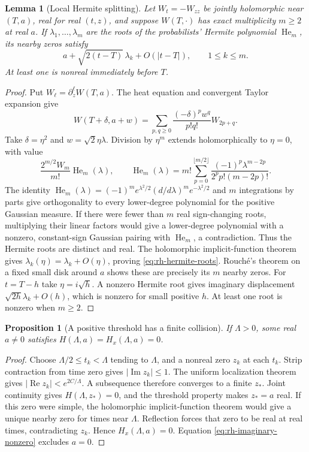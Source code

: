 \documentclass[11pt]{article}
\numberwithin{equation}{section}
\newtheorem{proposition}[theorem]{Proposition}
\newtheorem{lemma}[theorem]{Lemma}
\theoremstyle{definition}
\theoremstyle{remark}
\begin{document}
\begin{lemma}[Local Hermite splitting]\label{lem:rh-hermite}
Let $W_t=-W_{zz}$ be jointly holomorphic near $(T,a)$, real for real
$(t,z)$, and suppose $W(T,\cdot)$ has exact multiplicity $m\ge2$ at
real $a$.  If $\lambda_1,\ldots,\lambda_m$ are the roots of the
probabilists' Hermite polynomial $\operatorname{He}_m$, its nearby zeros
satisfy
\begin{equation}
 a+\sqrt{2(t-T)}\,\lambda_k+O(|t-T|),\qquad 1\le k\le m.
 \label{eq:rh-hermite-roots}
\end{equation}
At least one is nonreal immediately before $T$.
\end{lemma}
\begin{proof}
Put $W_\ell=\partial_z^\ell W(T,a)$.  The heat equation and convergent
Taylor expansion give
\[
 W(T+\delta,a+w)=\sum_{p,q\ge0}
 \frac{(-\delta)^p w^q}{p!q!}W_{2p+q}.
\]
Take $\delta=\eta^2$ and $w=\sqrt2\eta\lambda$.  Division by
$\eta^m$ extends holomorphically to $\eta=0$, with value
\[
 \frac{2^{m/2}W_m}{m!}\operatorname{He}_m(\lambda),\qquad
 \operatorname{He}_m(\lambda)=m!\sum_{p=0}^{\lfloor m/2\rfloor}
 \frac{(-1)^p\lambda^{m-2p}}{2^p p!(m-2p)!}.
\]
The identity
$\operatorname{He}_m(\lambda)=(-1)^m e^{\lambda^2/2}
(d/d\lambda)^m e^{-\lambda^2/2}$ and $m$ integrations by parts
give orthogonality to every lower-degree polynomial for the positive
Gaussian measure.  If there were fewer than $m$ real sign-changing
roots, multiplying their linear factors would give a lower-degree
polynomial with a nonzero, constant-sign Gaussian pairing with
$\operatorname{He}_m$, a contradiction.  Thus the Hermite roots are
distinct and real.
The holomorphic implicit-function theorem gives
$\lambda_k(\eta)=\lambda_k+O(\eta)$, proving
\eqref{eq:rh-hermite-roots}.  Rouch\'e's theorem on a fixed small disk
around $a$ shows these are precisely its $m$ nearby zeros.
For $t=T-h$ take $\eta=i\sqrt h$.  A nonzero Hermite root gives
imaginary displacement $\sqrt{2h}\lambda_k+O(h)$, which is nonzero
for small positive $h$.  At least one root is nonzero when $m\ge2$.
\end{proof}

\begin{proposition}[A positive threshold has a finite collision]
\label{prop:rh-finite-collision}
If $\Lambda>0$, some real $a\ne0$ satisfies
$H(\Lambda,a)=H_x(\Lambda,a)=0$.
\end{proposition}
\begin{proof}
Choose $\Lambda/2\le t_k<\Lambda$ tending to $\Lambda$, and a
nonreal zero $z_k$ at each $t_k$.  Strip contraction from time zero
gives $|\operatorname{Im}z_k|\le1$.  The uniform localization theorem
gives $|\operatorname{Re}z_k|<e^{2C/\Lambda}$.  A subsequence therefore
converges to a finite $z_*$.  Joint continuity gives
$H(\Lambda,z_*)=0$, and the threshold property makes $z_*=a$ real.
If this zero were simple, the holomorphic implicit-function theorem
would give a unique nearby zero for times near $\Lambda$.  Reflection
forces that zero to be real at real times, contradicting $z_k$.
Hence $H_x(\Lambda,a)=0$.  Equation
\eqref{eq:rh-imaginary-nonzero} excludes $a=0$.
\end{proof}
\end{document}
